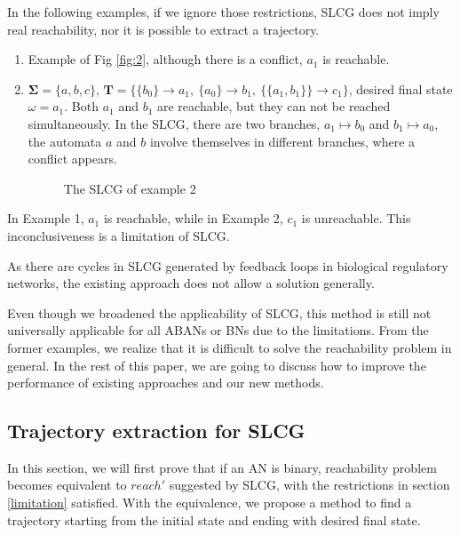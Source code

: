 \documentclass[runningheads]{llncs}
\newcommand{\acm}[3]{\{#1\}\rightarrow#3}
\begin{document}
In the following examples, if we ignore those restrictions, SLCG does not imply real reachability, nor it is possible to extract a trajectory.

\begin{enumerate}
\item Example of %
Fig \ref{fig:2}, although there is a conflict, $a_1$ is reachable.
\item $\mathbf{\Sigma}=\{a,b,c\}$, $\mathbf{T}=\{\acm{b_0}{a_0}{a_1},\ \acm{a_0}{b_0}{b_1},\ \acm{\{a_1,b_1\}}{c_0}{c_1}\}$,  desired final state $\omega=a_1$. 
Both $a_1$ and $b_1$ are reachable, but they can not be reached simultaneously.
In the SLCG, there are two branches, $a_1\mapsto b_0$ and $b_1\mapsto a_0$, the automata $a$ and $b$ involve themselves in different branches, where a conflict appears.
\begin{figure}[ht]
\centering

\caption{The SLCG of example 2}
\label{fig:3}
\end{figure}
%

\end{enumerate}

In Example 1, $a_1$ is reachable, while in Example 2, $c_1$ is unreachable. This inconclusiveness is a limitation of SLCG.

As there are cycles in SLCG generated by feedback loops in biological regulatory networks, the existing approach does not allow a solution generally.

Even though we broadened the applicability of SLCG, this method is still not universally applicable for all ABANs or BNs due to the limitations. From the former examples, we realize that it is difficult to solve the reachability problem in general. 
In the rest of this paper, we are going to discuss how to improve the performance of existing approaches and our new methods. 

\subsection{Trajectory extraction for SLCG}\label{sectExtract}
In this section, we will first prove that if an AN is binary, reachability problem becomes equivalent to $reach'$ suggested by SLCG, with the restrictions in section \ref{limitation} satisfied.
With the equivalence, we propose a method to find a trajectory starting from the initial state and ending with desired final state.
\end{document}
